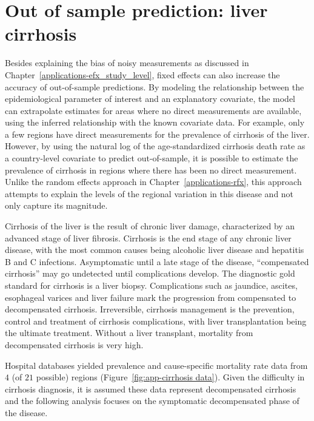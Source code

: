\chapter{Out of sample prediction: liver cirrhosis}
\label{applications-efx_country_level}

Besides explaining the bias of noisy measurements as discussed in
Chapter~\ref{applications-efx_study_level}, fixed effects can also
increase the accuracy of out-of-sample predictions.  By modeling the
relationship between the epidemiological parameter of interest and an
explanatory covariate, the model can extrapolate estimates for areas
where no direct measurements are available, using the inferred
relationship with the known covariate data.  For example, only a few
regions have direct measurements for the prevalence of cirrhosis of
the liver.  However, by using the natural log of the age-standardized
cirrhosis death rate as a country-level covariate to predict
out-of-sample, it is possible to estimate the prevalence of cirrhosis
in regions where there has been no direct measurement.  Unlike the
random effects approach in Chapter~\ref{applications-rfx}, this
approach attempts to explain the levels of the regional variation in
this disease and not only capture its magnitude.

Cirrhosis of the liver is the result of chronic liver damage,
characterized by an advanced stage of liver fibrosis.  Cirrhosis is
the end stage of any chronic liver disease, with the most common
causes being alcoholic liver disease and hepatitis B and C infections.
Asymptomatic until a late stage of the disease, ``compensated
cirrhosis'' may go undetected until complications develop.  The
diagnostic gold standard for cirrhosis is a liver biopsy.
Complications such as jaundice, ascites, esophageal varices
and liver failure mark the progression
from compensated to decompensated cirrhosis.  Irreversible, cirrhosis
management is the prevention, control and treatment of cirrhosis
complications, with liver transplantation being the ultimate
treatment.  Without a liver transplant, mortality from decompensated
cirrhosis is very high. \cite{garcia-tsao_management_2009,
  damico_natural_2006, schuppan_liver_2008}

Hospital databases yielded prevalence and cause-specific mortality rate
data from $4$ (of $21$ possible) regions (Figure~\ref{fig:app-cirrhosis data}).
Given the difficulty in
cirrhosis diagnosis, it is assumed these data represent decompensated
cirrhosis and the following analysis focuses on the symptomatic
decompensated phase of the disease.


